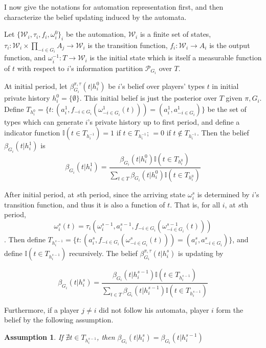 \documentclass[12pt,letter]{article}
\newtheorem{assumption}{Assumption}[section]
\theoremstyle{remark}
\theoremstyle{remark}
\theoremstyle{claim}
\begin{document}
I now give the notations for automation representation first, and then characterize the belief updating induced by the automata.

Let $\{\mathcal{W}_i, \tau_i, f_i, \omega^{0}_i\}_i$ be the automation, $\mathcal{W}_i$ is a finite set of states, $\tau_i: \mathcal{W}_i\times \prod_{-i\in G_i}A_j\rightarrow \mathcal{W}_i$ is the transition function, $f_i: \mathcal{W}_i\rightarrow A_i$ is the output function, and $\omega^{-1}_i: T\rightarrow \mathcal{W}_i$ is the initial state which is itself a measurable function of $t$ with respect to $i$'s information partition $\mathcal{P}_{G_i}$ over $T$. 

At initial period, let $\beta^{\pi,\tau}_{G_i}(t|h^{0}_i)$ be $i$'s belief over players' types $t$ in initial private history $h^{0}_i=\{\emptyset\}$. This initial belief is just the posterior over $T$ given $\pi,G_i$. Define $T_{h^{0}_i}=\{t: (a^1_i,f_{-i\in G_i}(\omega^1_{-i\in G_i}(t)))=(a^1_i,a^1_{-i\in G_i})\}$ be the set of types which can generate $i$'s private history up to first period, and define a indicator function $\mathbb{I}(t\in T_{h^{-1}_i})=1$ if $t\in T_{h^{-1}_i}$; $=0$ if $t\notin T_{h^{-1}_i}$. Then the 
belief $\beta_{G_i}(t|h^1_i)$ is 
\begin{equation}
\label{eqn:updatingini}
\beta_{G_i}(t|h^1_i)=\frac{\beta_{G_i}(t|h^{0}_i)\mathbb{I}(t\in T_{h^{0}_i})}{\sum_{t\in T}\beta_{G_i}(t|h^{0}_i)\mathbb{I}(t\in T_{h^{0}_i})}
\end{equation}

After initial period, at $s$th period, since the arriving state $\omega^s_i$ is determined by $i$'s transition function, and thus it is also a function of $t$. That is, for all $i$, at $s$th period,
\begin{equation}
\omega^s_i(t) =\tau_i(\omega^{s-1}_i, a^{s-1}_i, f_{-i\in G_i}(\omega^{s-1}_{-i\in G_i}(t)))
\end{equation}
. Then define $T_{h^{s-1}_i} = \{t: (a^s_i,f_{-i\in G_i}(\omega^s_{-i\in G_i}(t)))=(a^s_i,a^s_{-i\in G_i})\}$, and define $\mathbb{I}(t\in T_{h^{s-1}_i})$ recursively. The belief $\beta^{\pi, \tau}_{G_i}(t|h^s_i)$ is updating by

\begin{equation}
\label{eqn:updatingend}
\beta_{G_i}(t|h^s_i)=\frac{\beta_{G_i}(t|h^{s-1}_i)\mathbb{I}(t\in T_{h^{s-1}_i})}{\sum_{t\in T}\beta_{G_i}(t|h^{s-1}_i)\mathbb{I}(t\in T_{h^{s-1}_i})}
\end{equation}

Furthermore, if a player $j\neq i$ did not follow his automata, player $i$ form the belief by the following assumption.
\begin{assumption}
\label{assm:notexists}
If $\nexists t\in T_{h^{s-1}_i} $, then $\beta_{G_i}(t|h^s_i)=\beta_{G_i}(t|h^{s-1}_i)$
\end{assumption}
\end{document}
